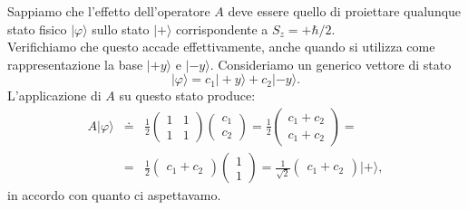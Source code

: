 \documentclass[a4paper,12pt,oneside]{book}
\begin{document}
Sappiamo che l'effetto dell'operatore $A$ deve essere quello di proiettare qualunque stato fisico $| \varphi \rangle $ sullo stato $| + \rangle $ corrispondente a $S_z=+\hbar/2$.\\
Verifichiamo che questo accade effettivamente, anche quando si utilizza come rappresentazione la base $| +y \rangle $ e $| -y \rangle $. Consideriamo un generico vettore di stato
	\begin{equation}
		| \varphi \rangle = c_1 | +y \rangle + c_2| -y \rangle .
	\end{equation}
L'applicazione di $A$ su questo stato produce:
	\begin{eqnarray}
		A | \varphi \rangle &\doteq & \frac{1}{2}
		\begin{pmatrix}
		1 & 1\\
		1 & 1
		\end{pmatrix}
		\begin{pmatrix}
		c_1\\
		c_2
		\end{pmatrix}=
		\frac{1}{2}
		\begin{pmatrix}
		c_1+c_2\\
		c_1+c_2
		\end{pmatrix}=\nonumber \\
		&=& \frac{1}{2}
		\begin{pmatrix}
		c_1 + c_2
		\end{pmatrix}
		\begin{pmatrix}
		1\\
		1
		\end{pmatrix}=
		\frac{1}{\sqrt{2}}
		\begin{pmatrix}
		c_1 + c_2
			\end{pmatrix}
		| + \rangle ,
	\end{eqnarray}
in accordo con quanto ci aspettavamo.
\end{document}
